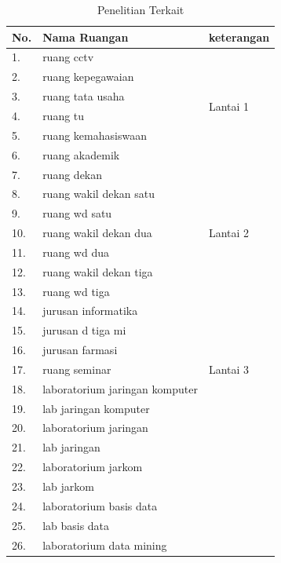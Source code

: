 \begin{enumerate}
	
	\begin{longtable}{| m{1cm} | m{6cm} | m{3cm} |}
    \caption{Penelitian Terkait}
    \label{t_data} \\
        \hline
        \textbf{No.}	& \textbf{Nama Ruangan}	& \textbf{keterangan}	\\
        \hline
		1.	& ruang cctv & \multirow{6}{*}{Lantai 1} \\ \cline{1-2}
		2.  & ruang kepegawaian					& \\ \cline{1-2}
		3.	& ruang tata usaha					& \\ \cline{1-2}
		4.	& ruang tu							& \\ \cline{1-2}
		5.	& ruang kemahasiswaan				& \\ \cline{1-2}
		6.	& ruang akademik					& \\
        \hline
        7.	& ruang dekan & \multirow{7}{*}{Lantai 2} \\ \cline{1-2}
		8.  & ruang wakil dekan satu			& \\ \cline{1-2}
		9.	& ruang wd satu						& \\ \cline{1-2}
		10.	& ruang wakil dekan dua				& \\ \cline{1-2}
		11.	& ruang wd dua						& \\ \cline{1-2}
		12.	& ruang wakil dekan tiga			& \\ \cline{1-2}
		13.	& ruang wd tiga						& \\ 
		\hline
		14.	& jurusan informatika & \multirow{7}{*}{Lantai 3} \\ \cline{1-2}
		15.	& jurusan d tiga mi					& \\ \cline{1-2}
		16. & jurusan farmasi					& \\ \cline{1-2}
		17.	& ruang seminar						& \\ \cline{1-2}
		18.	& laboratorium jaringan komputer	& \\ \cline{1-2}
		19.	& lab jaringan komputer				& \\ \cline{1-2}
		20.	& laboratorium jaringan				& \\ \cline{1-2}
		21. & lab jaringan						& \\ \cline{1-2}
		22.	& laboratorium jarkom				& \\ \cline{1-2}
		23.	& lab jarkom						& \\ \cline{1-2}
		24.	& laboratorium basis data			& \\ \cline{1-2}
		25.	& lab basis data					& \\ \cline{1-2}
		26.	& laboratorium data mining			& \\ \cline{1-2}

\end{longtable}
\end{enumerate}
